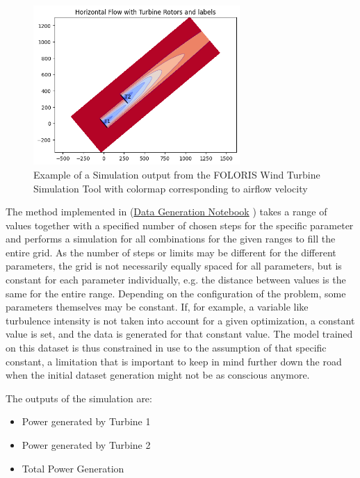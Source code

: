 \documentclass[preprint,12pt]{elsarticle}
\begin{document}
\begin{figure}[h] 
	\centering
	\includegraphics[width=0.7\textwidth]{../figures/modelling/Floris.png} 
	\caption{Example of a Simulation output from the FOLORIS Wind Turbine Simulation Tool \cite{nrel_floris} with colormap corresponding to airflow velocity}
	\label{fig:Floris}
\end{figure}

The method implemented in (\href{https://github.com/schmeti/uc3m_TFM_wind_farm_optimization_codebase/blob/main/Windfarm_power_modelling/generate_data_floris.ipynb}{Data Generation Notebook} \cite{schmetz2025_gendata_git}) takes a range of values together with a specified number of chosen steps for the specific parameter and performs a simulation for all combinations for the given ranges to fill the entire grid. As the number of steps or limits may be different for the different parameters, the grid is not necessarily equally spaced for all parameters, but is constant for each parameter individually, e.g. the distance between values is the same for the entire range.  
Depending on the configuration of the problem, some parameters themselves may be constant. If, for example, a variable like turbulence intensity is not taken into account for a given optimization, a constant value is set, and the data is generated for that constant value. The model trained on this dataset is thus constrained in use to the assumption of that specific constant, a limitation that is important to keep in mind further down the road when the initial dataset generation might not be as conscious anymore. 

The outputs of the simulation are:
\begin{itemize}
	\item Power generated by Turbine 1
	\item Power generated by Turbine 2
	\item Total Power Generation
\end{itemize}
\end{document}
